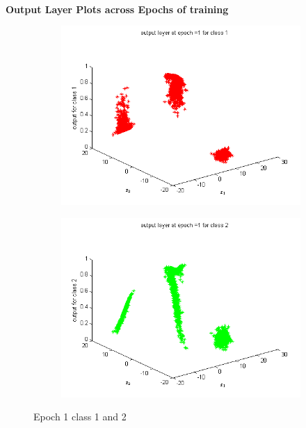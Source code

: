 \documentclass{article}
\begin{document}
\begin{flushleft}
\textbf{\\[10pt]Output Layer Plots across Epochs of training}
\begin{figure}
\begin{subfigure}{.5\textwidth}
  \centering
  \includegraphics[width=.8\linewidth]{Classification/linearlySeparable/1_1}
 
\end{subfigure}%
\begin{subfigure}{.5\textwidth}
  \centering
  \includegraphics[width=.8\linewidth]{Classification/linearlySeparable/1_2}
  
\end{subfigure}
\caption{Epoch 1 class 1 and 2}
\end{figure}


\end{flushleft}
\end{document}
